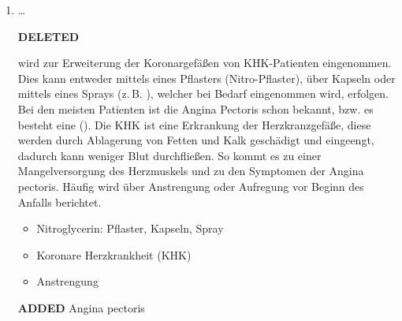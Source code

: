 \documentclass[
ngerman,
paper=a4,
asymmetric,
fontsize=10pt,
headings=small,
draft=false,
numbers=noenddot,
bibtotocnumbered,
footnotes=multiple,
]{scrreprt}
\newcommand{\jALT}{{\color{red}\sffamily\textbf{DELETED}\hrulefill\newline\newline}}
\newcommand{\jALTende}{\newline{\color{red}\rule{\linewidth}{2pt}\newline}}
\newcommand{\jNEU}{{\color{green}\sffamily\textbf{ADDED}\hrulefill\newline\newline}}
\newcommand{\jNEUende}{\newline{\color{green}\rule{\linewidth}{3pt}\newline}}
\begin{document}
\begin{enumerate}
\jNEU
 \begin{itemize}
  \item[\SAMPLE{S}]
  \begin{itemize}
    \item Stechender/brennender  mit
    Ausstrahlung oder 
    
    \enquote*{Stummer Verlauf} bei Diabetikern möglich
    \item {}
    \item Druckgefühl, 
    \item Todesangst
    \item Ggfs. kardiogener Schock
  \end{itemize}
  \item[\SAMPLE{M}] Nitroglycerin: Pflaster, Kapseln, Spray
  \item[\SAMPLE{P}] Koronare Herzkrankheit (KHK)
  \item[\SAMPLE{E}] Körperliche Anstrengung
 \end{itemize}
 \jNEUende

\item \ldots

\jALT
\TextSlide{\TxSAMPLE}
{  wird zur Erweiterung der
Koronargefäßen von KHK-Patienten eingenommen. Dies kann
entweder mittels eines Pflasters (Nitro-Pflaster), über
Kapseln oder mittels eines Sprays (z.\,B.
), welcher bei Bedarf
eingenommen wird, erfolgen. 
 Bei den meisten Patienten ist die Angina
Pectoris schon bekannt, bzw. es besteht eine  (). Die KHK ist eine Erkrankung der
Herzkranzgefäße, diese werden durch Ablagerung von Fetten
und Kalk geschädigt und eingeengt, dadurch kann weniger Blut
durchfließen. So kommt es zu einer Mangelversorgung des
Herzmuskels und zu den Symptomen der Angina pectoris.
 Häufig wird über Anstrengung oder Aufregung vor
Beginn des Anfalls berichtet. 
 
}
{
 \begin{itemize}
  \item[\SAMPLE{M}] Nitroglycerin: Pflaster, Kapseln, Spray
  \item[\SAMPLE{P}] Koronare Herzkrankheit (KHK)
  \item[\SAMPLE{E}] Anstrengung
 \end{itemize}
 }
 {}
 {}
 {}
\jALTende

\jNEU
\TextSlide
{Angina pectoris}
{
\label{topic:angina-pectoris}
 
}
\end{enumerate}
\end{document}
